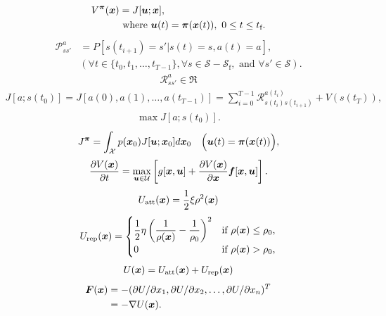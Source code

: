 \begin{align}
V^{\boldsymbol{\pi}}(\boldsymbol{x}) &= J[\boldsymbol{u};\boldsymbol{x}], \label{eq:def_of_value} \\
&\text{ where } \boldsymbol{u}(t) = \boldsymbol{\pi}(\boldsymbol{x}(t)), \ 0\le t \le t_\text{f}. \nonumber 
\end{align}
\begin{align}
\mathcal{P}_{ss'}^a &= P[s(t_{i+1}) = s' | s(t) = s,a(t) = a], \label{eq:state_transition}\\
&(\forall t \in \{t_0,t_1,\dots,t_{T-1}\}, \forall s \in \mathcal{S} - \mathcal{S}_\text{f}, \text{ and } \forall s' \in \mathcal{S}). \nonumber
\end{align}
\begin{align}
\mathcal{R}_{ss'}^a \in \Re
\end{align}
\begin{align}
J[a;s(t_0)] = J[a(0),a(1),\dots,a(t_{T-1})] = \sum_{i=0}^{T-1} \mathcal{R}_{s(t_i)s(t_{i+1})}^{a(t_i)} + V(s(t_T)),
\end{align}
\begin{align}
\max J[a;s(t_0)]. 
\end{align}
\begin{align}
J^{\boldsymbol{\pi}} = \int_\mathcal{X} p(\boldsymbol{x}_0) J[\boldsymbol{u};\boldsymbol{x}_0] d\boldsymbol{x}_0 \quad\Big(\boldsymbol{u}(t) = \boldsymbol{\pi}(\boldsymbol{x}(t))\Big),\label{eq:eval_general}
\end{align}
\begin{align}
\dfrac{\partial V(\boldsymbol{x})}{\partial t} = \max_{\boldsymbol{u}\in\mathcal{U}} \left[g[\boldsymbol{x},\boldsymbol{u}] + \dfrac{\partial V(\boldsymbol{x})}{\partial\boldsymbol{x}} \boldsymbol{f}[\boldsymbol{x},\boldsymbol{u}] \right].\label{eq:hjb}
\end{align}
\begin{align}
U_\text{att}(\boldsymbol{x}) = \dfrac{1}{2} \xi \rho^2 (\boldsymbol{x})
\end{align}
\begin{align}
U_\text{rep}(\boldsymbol{x}) =
\begin{cases}
\dfrac{1}{2}\eta \left( \dfrac{1}{\rho(\boldsymbol{x})} - \dfrac{1}{\rho_0} \right)^2 &\text{if } \rho(\boldsymbol{x}) \le \rho_0, \\
0 &\text{if } \rho(\boldsymbol{x}) > \rho_0,
\end{cases}
\end{align}
\begin{align}
U(\boldsymbol{x}) = U_\text{att}(\boldsymbol{x}) + U_\text{rep}(\boldsymbol{x})
\end{align}
\begin{align}
\boldsymbol{F}(\boldsymbol{x}) &= - (\partial U/\partial x_1,\partial U/\partial x_2,\dots,\partial U/\partial x_n)^T \nonumber \\
&= -\nabla U({\boldsymbol{x}}). 
\end{align}
